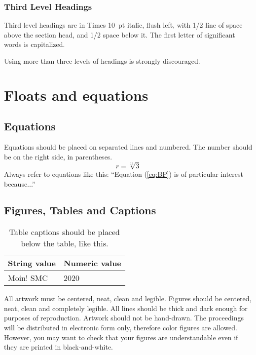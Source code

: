 \documentclass{article}
\begin{document}
\subsubsection{Third Level Headings}
Third level headings are in Times 10~pt italic, flush left, with 1/2 line of space above the section head, and 1/2 space below it. The first letter of significant words is capitalized.

Using more than three levels of headings is strongly discouraged.





\section{Floats and equations}

\subsection{Equations}
Equations should be placed on separated lines and numbered. The number should be on the right side, in parentheses.
\begin{equation}
r=\sqrt[13]{3}
\label{eq:BP}
\end{equation}
Always refer to equations like this: ``Equation (\ref{eq:BP}) is of particular interest because...''

\subsection{Figures, Tables and Captions}
\begin{table}[t]
 \begin{center}
 \begin{tabular}{|l|l|}
  \hline
  String value & Numeric value \\
  \hline
  Moin! SMC & 2020 \\
  \hline
 \end{tabular}
\end{center}
 \caption{Table captions should be placed below the table,  like this.}
 \label{tab:example}
\end{table}

All artwork must be centered, neat, clean and legible. Figures should be centered, neat, clean
and completely legible. All lines should be thick and dark enough for purposes of reproduction. Artwork should not be hand-drawn. The proceedings will be distributed in electronic form only, therefore color figures are allowed. However, you may want to check that your figures are understandable even if they are printed in black-and-white.
\end{document}
